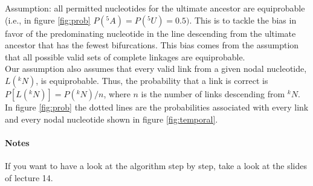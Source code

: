 Assumption: all permitted nucleotides for the ultimate ancestor are equiprobable (i.e., in figure \ref{fig:prob} $P(^5 A) = P(^5 U) = 0.5)$.
This is to tackle the bias in favor of the predominating nucleotide in the line descending from the ultimate ancestor that has the fewest bifurcations. This bias comes from the assumption that all possible valid sets of complete linkages are equiprobable.
\\
Our assumption also assumes that every valid link from a given nodal nucleotide, $L(^k N)$, is equiprobable. Thus, the probability that a link is correct is $P[L(^k N)] = P(^k N) / n$, where $n$ is the number of links descending from $^k N$.
\\
In figure \ref{fig:prob} the dotted lines are the probabilities associated with every link and every nodal nucleotide shown in figure \ref{fig:temporal}.

\paragraph{Notes}
	If you want to have a look at the algorithm step by step, take a look at the slides of lecture 14.

